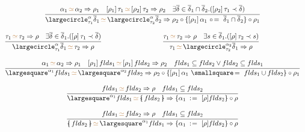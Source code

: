 \documentclass[11pt,a4paper]{article}
\newcommand{\record}[1]{\{\!\!\shortmid #1 \shortmid\!\!\}}
\newcommand{\overld}[3]{\largecircle^{#1}_{#2}{#3}}
\newcommand{\irecrd}[2]{\largesquare^{#1}{#2}}
\newcommand{\tyvarsubst}[2]{#1\ \hspace{-0.2ex}:\hspace{1pt}=\ #2}
\newcommand{\ovldrefine}[2]{#1\ \circ\hspace{-0.3ex}=\ #2}
\newcommand{\irecextend}[2]{#1\ \smallsquare\hspace{-0.3ex}=\ #2}
\newcommand{\unify}[3]{#1\,{\color{brown}{\simeq}}\,#2 \Rightarrow #3}
\newcommand{\subst}[2]{[#1]\,#2}
\newcommand{\braced}[1]{\{#1\}}
\newcommand{\compose}[2]{#1 \circ #2}
\newcommand{\type}{\tau}
\begin{document}
\[
\begin{array}{ccc}
 \multicolumn{3}{c}{\cfrac
  {\unify{\alpha_1}{\alpha_2}{\rho_1} \quad \unify{\subst{\rho_1}{\type_1}}{\subst{\rho_2}{\type_2}}{\rho_2} \quad
   \exists \s \in \s_1 \cap \s_2. (\subst{\rho_2}{\type_1} \prec \s)}
  {\unify{\overld{\alpha}{\type_1}{\s_1}}{\overld{\alpha}{\type_2}{\s_2}}
         {\rho_2 \circ \{\ovldrefine{\subst{\rho_1}{\alpha_1}}{\s_1 \cap \s_2}\} \circ \rho_1}}}              \\
 & &                                                                                                        \\
 \cfrac
  {\unify{\type_1}{\type_2}{\rho} \quad \exists \s \in \s_1. (\subst{\rho}{\type_1} \prec \s)}
  {\unify{\overld{\alpha}{\type_1}{\s_1}}{\type_2}{\rho}} & \quad &
 \cfrac
  {\unify{\type_1}{\type_2}{\rho} \quad \exists s \in \s_1. (\subst{\rho}{\type_2} \prec s)}
  {\unify{\type_1}{\overld{\alpha_2}{\type_2}{\s_1}}{\rho}}                                                          \\
 & &                                                                                                        \\
 \multicolumn{3}{c}{\cfrac
  {\unify{\alpha_1}{\alpha_2}{\rho_1} \quad
   \unify{\subst{\rho_1}{flds_1}}{\subst{\rho_1}{flds_2}}{\rho_2} \quad
   flds_1 \subseteq flds_2 \vee flds_2 \subseteq flds_1 }
  {\unify{\irecrd{\alpha_1}{flds_1}}{\irecrd{\alpha_2}{flds_2}}
         {\rho_2 \circ \{\irecextend{\subst{\rho_1}{\alpha_1}}{flds_1 \cup flds_2}\} \circ \rho_1}}}        \\
 & &                                                                                                        \\
 \multicolumn{3}{c}{\cfrac
  {\unify{flds_1}{flds_2}{\rho} \quad flds_1 \subseteq flds_2}
  {\unify{\irecrd{\alpha_1}{flds_1}}{\record{flds_2}}
         {\compose{\braced{\tyvarsubst{\alpha_1}{[\rho]flds_2}}}{\rho}}}}                                   \\
 & &                                \\
 \multicolumn{3}{c}{\cfrac
  {\unify{flds_1}{flds_2}{\rho} \quad flds_1 \subseteq flds_2}
  {\unify{\record{flds_2}}{\irecrd{\alpha_1}{flds_1}}
         {\compose{\braced{\tyvarsubst{\alpha_1}{[\rho]flds_2}}}{\rho}}}}                                   \\
\end{array}
\]
\end{document}
